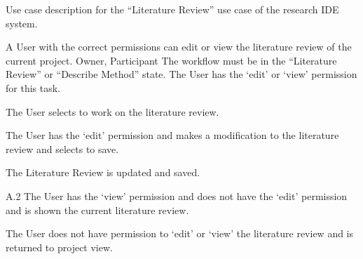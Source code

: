 \documentclass[document.tex]{subfiles}
\begin{document}
\begin{table}
  \centering
  \caption{Use case description for the ``Literature Review'' use case of the research IDE system.}
  \label{tbl:use-case-literature-review}

  \begin{usecase}
    A User with the correct permissions can edit or view the literature review of the current project.
    Owner, Participant
    The workflow must be in the “Literature Review” or “Describe Method” state. The User has the ‘edit’ or ‘view’ permission for this task.
    \ucnormal
    \begin{ucenum}
      \item The User selects to work on the literature review.
      \item The User has the ‘edit’ permission and makes a modification to the literature review and selects to save.
      \item The Literature Review is updated and saved.
    \end{ucenum}
    \begin{ucenum}
      \item [A.2] The User has the ‘view’ permission and does not have the ‘edit’ permission and is shown the current literature review.
    \end{ucenum}
    The User does not have permission to ‘edit’ or ‘view’ the literature review and is returned to project view.
  \end{usecase}
\end{table}
\end{document}
